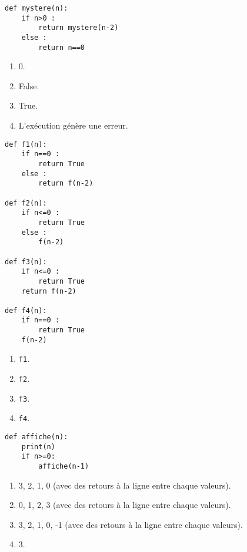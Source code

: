 \begin{lstlisting}
def mystere(n):
    if n>0 :
        return mystere(n-2)
    else :
        return n==0
\end{lstlisting}

\begin{enumerate}
\item 0.
\item False.
\item True. %
\item L'exécution génère une erreur.
\end{enumerate}

\begin{lstlisting}
def f1(n):
    if n==0 :
        return True
    else :
        return f(n-2)
        
def f2(n):
    if n<=0 :
        return True
    else :
        f(n-2)
        
def f3(n):
    if n<=0 :
        return True
    return f(n-2)

def f4(n):
    if n==0 :
        return True
    f(n-2)
\end{lstlisting}


\begin{enumerate}
\item \texttt{f1}.
\item \texttt{f2}.
\item \texttt{f3}. %
\item \texttt{f4}.
\end{enumerate}

\begin{lstlisting}
def affiche(n):
    print(n)
    if n>=0:
        affiche(n-1)
\end{lstlisting}

\begin{enumerate}
\item 3, 2, 1, 0 (avec des retours à la ligne entre chaque valeurs).
\item 0, 1, 2, 3 (avec des retours à la ligne entre chaque valeurs).
\item 3, 2, 1, 0, -1 (avec des retours à la ligne entre chaque valeurs). %
\item 3.
\end{enumerate}

